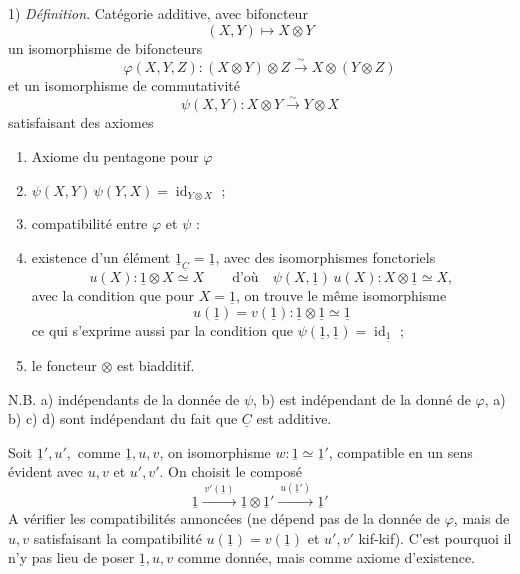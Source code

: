 \documentclass[11pt,a4paper]{article}
\begin{document}
1) \emph{Définition}. Catégorie \struck{\ill{}} additive, avec bifoncteur
\[
(X,Y) \mapsto X \otimes Y
\]
 un  isomorphisme de bifoncteurs
\[
\varphi(X,Y,Z) : (X \otimes Y) \otimes Z \overset{\sim}{\longrightarrow}
X \otimes (Y \otimes Z)
\]
et un isomorphisme de commutativité
\[
\psi(X,Y) : X \otimes Y \overset{\sim}{\longrightarrow} Y \otimes X
\]
satisfaisant des axiomes
\begin{enumerate}
\item[a)] Axiome du pentagone pour $\varphi$ 
\item[b)] $\psi(X,Y)\,\psi(Y,X) = \operatorname{id}_{Y \otimes X}$ ;
\item[c)] compatibilité entre $\varphi$ et $\psi$ : 
\item[d)] existence d'un élément $\underline{1}_{\underline{C}} = \underline{1}$,
avec des isomorphismes fonctoriels
\[
u(X) : \underline{1} \otimes X \simeq X \qquad \text{d'où} \quad
\psi(X,\underline{1})\,u(X) : X \otimes \underline{1} \simeq X ,
\]
avec la condition que pour $X = \underline{1}$, on trouve le même
isomorphisme
\[
u(\underline{1}) = v(\underline{1}) : \underline{1} \otimes \underline{1}
\simeq \underline{1}
\]
ce qui s'exprime aussi par la condition que
$\psi(\underline{1},\underline{1}) = \operatorname{id}_{\underline{1}}$ ;
\item[e)] le foncteur $\otimes$ est biadditif.
\end{enumerate}


N.B. a)   indépendants de la donnée de $\psi$,
b) est indépendant de la donné de $\varphi$, a) b) c) d) sont indépendant du
fait que $\underline{C}$ est additive.

Soit $\underline{1}', u', $ comme $\underline{1}, u, v$, on
 
isomorphisme $w : \underline{1} \simeq \underline{1}'$, compatible en un sens
évident avec $u, v$ et $u', v'$. On choisit le composé
\[
\underline{1} \xrightarrow{\ v'(\underline{1})\ } \underline{1} \otimes
\underline{1}' \xrightarrow{\ u(\underline{1}')\ } \underline{1}'
\]
A vérifier les compatibilités annoncées (ne dépend pas de la donnée de
$\varphi$,  mais de $u, v$ satisfaisant la compatibilité
$u(\underline{1}) = v(\underline{1})$ et $u', v'$ kif-kif). C'est pourquoi il
n'y  pas lieu de poser $\underline{1}, u, v$ comme donnée, mais comme
axiome d'existence.
\end{document}
